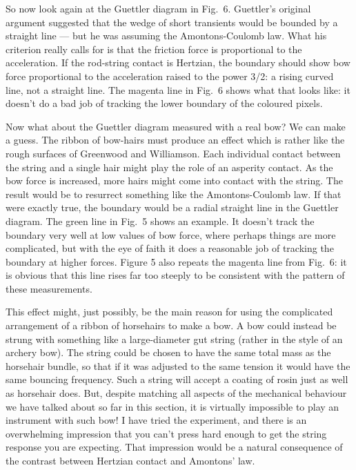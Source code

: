   So now look again at the Guettler diagram in Fig.\ 6. Guettler’s original 
  argument suggested that the wedge of short transients would be bounded by a 
  straight line — but he was assuming the Amontons-Coulomb law. What his 
  criterion really calls for is that the friction force is proportional to the 
  acceleration. If the rod-string contact is Hertzian, the boundary should show 
  bow force proportional to the acceleration raised to the power 3/2: a rising 
  curved line, not a straight line. The magenta line in Fig.\ 6 shows what that 
  looks like: it doesn’t do a bad job of tracking the lower boundary of the 
  coloured pixels. 

  Now what about the Guettler diagram measured with a real bow? We can make a 
  guess. The ribbon of bow-hairs must produce an effect which is rather like 
  the rough surfaces of Greenwood and Williamson. Each individual contact 
  between the string and a single hair might play the role of an asperity 
  contact. As the bow force is increased, more hairs might come into contact 
  with the string. The result would be to resurrect something like the 
  Amontons-Coulomb law. If that were exactly true, the boundary would be a 
  radial straight line in the Guettler diagram. The green line in Fig.\ 5 shows 
  an example. It doesn’t track the boundary very well at low values of bow 
  force, where perhaps things are more complicated, but with the eye of faith 
  it does a reasonable job of tracking the boundary at higher forces. Figure 5 
  also repeats the magenta line from Fig.\ 6: it is obvious that this line 
  rises far too steeply to be consistent with the pattern of these 
  measurements. 

  This effect might, just possibly, be the main reason for using the 
  complicated arrangement of a ribbon of horsehairs to make a bow. A bow could 
  instead be strung with something like a large-diameter gut string (rather in 
  the style of an archery bow). The string could be chosen to have the same 
  total mass as the horsehair bundle, so that if it was adjusted to the same 
  tension it would have the same bouncing frequency. Such a string will accept 
  a coating of rosin just as well as horsehair does. But, despite matching all 
  aspects of the mechanical behaviour we have talked about so far in this 
  section, it is virtually impossible to play an instrument with such bow! I 
  have tried the experiment, and there is an overwhelming impression that you 
  can’t press hard enough to get the string response you are expecting. That 
  impression would be a natural consequence of the contrast between Hertzian 
  contact and Amontons' law. 

